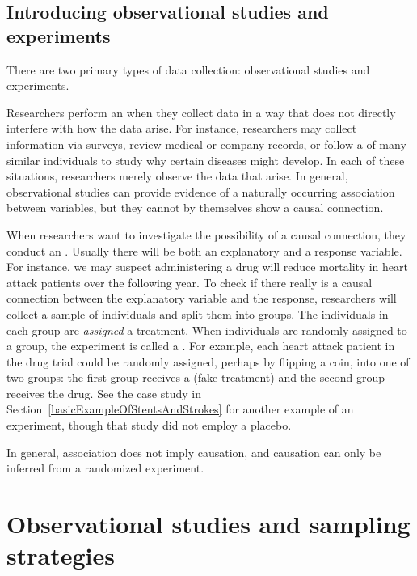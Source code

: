 
\subsection{Introducing observational studies and experiments}

There are two primary types of data collection: observational studies and experiments.

Researchers perform an  when they collect data in a way that does not directly interfere with how the data arise. For instance, researchers may collect information via surveys, review medical or company records, or follow a  of many similar individuals to study why certain diseases might develop. In each of these situations, researchers merely observe the data that arise. In general, observational studies can provide evidence of a naturally occurring association between variables, but they cannot by themselves show a causal connection.

When researchers want to investigate the possibility of a causal connection, they conduct an . Usually there will be both an explanatory and a response variable. For instance, we may suspect administering a drug will reduce mortality in heart attack patients over the following year. To check if there really is a causal connection between the explanatory variable and the response, researchers will collect a sample of individuals and split them into groups. The individuals in each group are \emph{assigned} a treatment. When individuals are randomly assigned to a group, the experiment is called a . For example, each heart attack patient in the drug trial could be randomly assigned,  perhaps by flipping a coin, into one of two groups: the first group receives a  (fake treatment) and the second group receives the drug. See the case study in Section~\ref{basicExampleOfStentsAndStrokes} for another example of an experiment, though that study did not employ a placebo.

\begin{tipBox}{
In general, association does not imply causation, and causation can only be inferred from a randomized experiment.}
\end{tipBox}


\section[Observational studies and sampling strategies]{Observational studies and sampling strategies }

